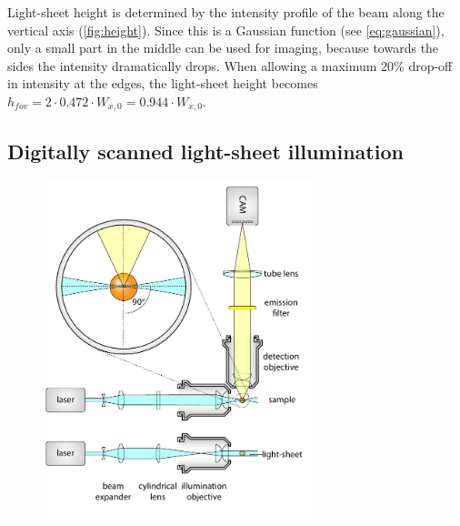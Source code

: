 
    Light-sheet height is determined by the intensity profile of the beam along the vertical axis (\autoref{fig:height}). Since this is a Gaussian function (see \autoref{eq:gaussian}), only a small part in the middle can be used for imaging, because towards the sides the intensity dramatically drops. When allowing a maximum 20\% drop-off in intensity at the edges, the light-sheet height becomes $h_{fov}=2\cdot 0.472\cdot W_{x,0} = 0.944 \cdot W_{x,0}$.
    

  \subsection{Digitally scanned light-sheet illumination}

    \begin{figure}[bt!]
      \centering
      \includegraphics[page=2,width=0.7\textwidth]{spim_cyl}
        \label{fig:dslm}
    \end{figure}

